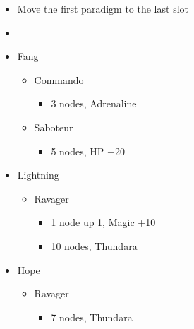 	\begin{menu}
		\begin{itemize}
			\paradigm
			\begin{itemize}
				\item Move the first paradigm to the last slot
				\item {}%
				      {\paradigmline{[\com]}{\com}{\rav}}
				      {\paradigmline{\com}{\rav}{(\rav)}}%
				      {\paradigmline[3]{\textit{(\sab)}}{\textit{(\rav)}}{\textit{\rav}}}%
				      {\paradigmline{\sen}{(\rav)}{(\rav)}}%
				      {\paradigmline{\sab}{(\rav)}{\syn}}%
				      {\paradigmline{\com}{\rav}{\rav}}
			\end{itemize}
			\crystarium
			\begin{itemize}
				\item Fang
				      \begin{itemize}
					      \item Commando
					            \begin{itemize}
						            \item 3 nodes, Adrenaline
					            \end{itemize}
					      \item Saboteur
					            \begin{itemize}
						            \item 5 nodes, HP +20
					            \end{itemize}
				      \end{itemize}
				\item Lightning
				      \begin{itemize}
					      \item Ravager
					            \begin{itemize}
						            \item 1 node up 1, Magic +10
						            \item 10 nodes, Thundara
					            \end{itemize}
				      \end{itemize}
				\item Hope
				      \begin{itemize}
					      \item Ravager
					            \begin{itemize}
						            \item 7 nodes, Thundara
					            \end{itemize}
				      \end{itemize}

\end{itemize}
\end{itemize}
\end{menu}
